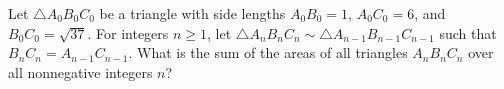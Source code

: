 Let $\triangle A_0B_0C_0$ be a triangle with side lengths $A_0B_0=1$, $A_0C_0=6$, and $B_0C_0=\sqrt{37}$. For integers $n\geq 1$, let $\triangle A_nB_nC_n\sim\triangle A_{n-1}B_{n-1}C_{n-1}$ such that $B_nC_n=A_{n-1}C_{n-1}$. What is the sum of the areas of all triangles $A_nB_nC_n$ over all nonnegative integers $n$?
